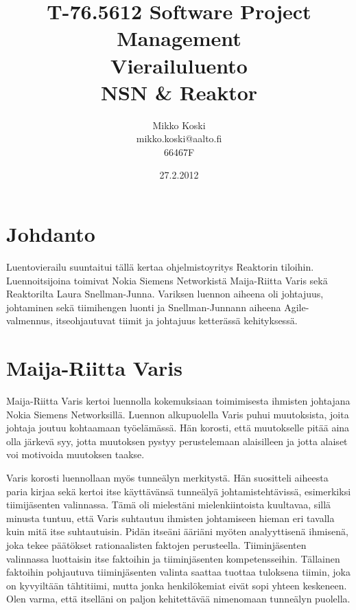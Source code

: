\documentclass[a4paper]{article}
\begin{document}
\title{\small T-76.5612 Software Project Management \\ Vierailuluento \\ \huge NSN \& Reaktor}
\date{27.2.2012}
\author{Mikko Koski \\ mikko.koski@aalto.fi \\ 66467F}
\maketitle

\normalsize

\section{Johdanto}

Luentovierailu suuntaitui tällä kertaa ohjelmistoyritys Reaktorin tiloihin. Luennoitsijoina toimivat Nokia Siemens Networkistä Maija-Riitta Varis sekä Reaktorilta Laura Snellman-Junna. Variksen luennon aiheena oli johtajuus, johtaminen sekä tiimihengen luonti ja Snellman-Junnann aiheena Agile-valmennus, itseohjautuvat tiimit ja johtajuus ketterässä kehityksessä.

\section{Maija-Riitta Varis}

Maija-Riitta Varis kertoi luennolla kokemuksiaan toimimisesta ihmisten johtajana Nokia Siemens Networksillä. Luennon alkupuolella Varis puhui muutoksista, joita johtaja joutuu kohtaamaan työelämässä. Hän korosti, että muutokselle pitää aina olla järkevä syy, jotta muutoksen pystyy perustelemaan alaisilleen ja jotta alaiset voi motivoida muutoksen taakse.

Varis korosti luennollaan myös tunneälyn merkitystä. Hän suositteli aiheesta paria kirjaa sekä kertoi itse käyttävänsä tunneälyä johtamistehtävissä, esimerkiksi tiimijäsenten valinnassa. Tämä oli mielestäni mielenkiintoista kuultavaa, sillä minusta tuntuu, että Varis suhtautuu ihmisten johtamiseen hieman eri tavalla kuin mitä itse suhtautuisin. Pidän itseäni ääriäni myöten analyyttisenä ihmisenä, joka tekee päätökset rationaalisten faktojen perusteella. Tiiminjäsenten valinnassa luottaisin itse faktoihin ja tiiminjäsenten kompetensseihin. Tällainen faktoihin pohjautuva tiiminjäsenten valinta saattaa tuottaa tuloksena tiimin, joka on kyvyiltään tähtitiimi, mutta jonka henkilökemiat eivät sopi yhteen keskeneen. Olen varma, että itselläni on paljon kehitettävää nimenomaan tunneälyn puolella.
\end{document}
